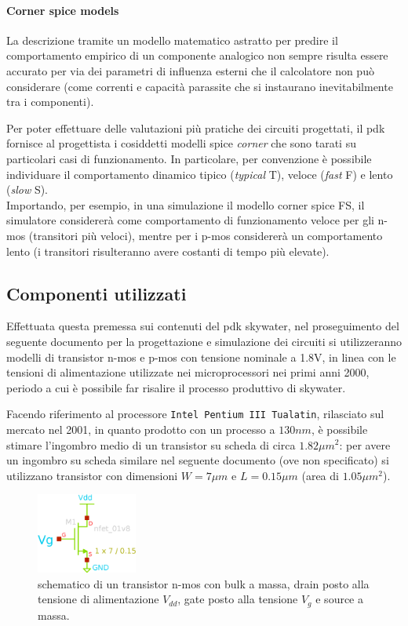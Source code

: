 		\paragraph{Corner spice models} La descrizione tramite un modello matematico astratto per predire il comportamento empirico di un componente analogico non sempre risulta essere accurato per via dei parametri di influenza esterni che il calcolatore non può considerare (come correnti e capacità parassite che si instaurano inevitabilmente tra i componenti).
		
		Per poter effettuare delle valutazioni più pratiche dei circuiti progettati, il pdk fornisce al progettista i cosiddetti modelli spice \textit{corner} che sono tarati su particolari casi di funzionamento. In particolare, per convenzione è possibile individuare il comportamento dinamico tipico (\textit{typical} T), veloce (\textit{fast} F) e lento (\textit{slow} S).\\
		Importando, per esempio, in una simulazione il modello corner spice FS, il simulatore considererà come comportamento di funzionamento veloce per gli n-mos (transitori più veloci), mentre per i p-mos considererà un comportamento lento (i transitori risulteranno avere costanti di tempo più elevate).
		
	\subsection*{Componenti utilizzati}
		Effettuata questa premessa sui contenuti del pdk skywater, nel proseguimento del seguente documento per la progettazione e simulazione dei circuiti si utilizzeranno modelli di transistor n-mos e p-mos con tensione nominale a 1.8V, in linea con le tensioni di alimentazione utilizzate nei microprocessori nei primi anni 2000, periodo a cui è possibile far risalire il processo produttivo di skywater. 
		
		Facendo riferimento al processore \texttt{Intel Pentium III Tualatin}, rilasciato sul mercato nel 2001, in quanto prodotto con un processo a $130nm$, è possibile stimare l'ingombro medio di un transistor su scheda di circa $1.82 \mu m^2$: per avere un ingombro su scheda similare nel seguente documento (ove non specificato) si utilizzano transistor con dimensioni $W = 7\mu m$ e $L = 0.15\mu m$ (area di $1.05\mu m^2$).
		
		\begin{figure}[bht]
			\centering
			\includegraphics[width=3.3cm]{Immagini/nmos.eps}
			\caption{schematico di un transistor n-mos con bulk a massa, drain posto alla tensione di alimentazione $V_{dd}$, gate posto alla tensione $V_g$ e source a massa.} \label{fig:intro:schematico-nmos}
		\end{figure}
	

